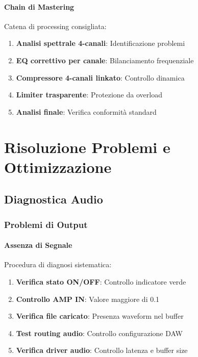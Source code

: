 \documentclass[a4paper,11pt,openany]{book}
\begin{document}
\subsubsection{Chain di Mastering}

Catena di processing consigliata:

\begin{enumerate}
    \item \textbf{Analisi spettrale 4-canali}: Identificazione problemi
    \item \textbf{EQ correttivo per canale}: Bilanciamento frequenziale
    \item \textbf{Compressore 4-canali linkato}: Controllo dinamica
    \item \textbf{Limiter trasparente}: Protezione da overload
    \item \textbf{Analisi finale}: Verifica conformità standard
\end{enumerate}

\chapter{Risoluzione Problemi e Ottimizzazione}

\section{Diagnostica Audio}

\subsection{Problemi di Output}

\subsubsection{Assenza di Segnale}

Procedura di diagnosi sistematica:


\begin{enumerate}
    \item \textbf{Verifica stato ON/OFF}: Controllo indicatore verde
    \item \textbf{Controllo AMP IN}: Valore maggiore di 0.1
    \item \textbf{Verifica file caricato}: Presenza waveform nel buffer
    \item \textbf{Test routing audio}: Controllo configurazione DAW
    \item \textbf{Verifica driver audio}: Controllo latenza e buffer size
\end{enumerate}
\end{document}
